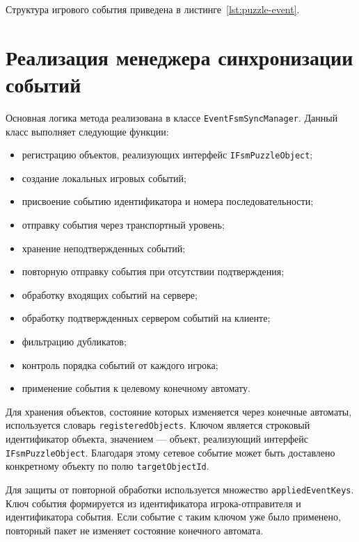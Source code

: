 
Структура игрового события приведена в листинге~\ref{lst:puzzle-event}.


\section{Реализация менеджера синхронизации событий}

Основная логика метода реализована в классе \texttt{EventFsmSyncManager}. Данный класс выполняет следующие функции:
\begin{itemize}
	\item регистрацию объектов, реализующих интерфейс \texttt{IFsmPuzzleObject};
	\item создание локальных игровых событий;
	\item присвоение событию идентификатора и номера последовательности;
	\item отправку события через транспортный уровень;
	\item хранение неподтвержденных событий;
	\item повторную отправку события при отсутствии подтверждения;
	\item обработку входящих событий на сервере;
	\item обработку подтвержденных сервером событий на клиенте;
	\item фильтрацию дубликатов;
	\item контроль порядка событий от каждого игрока;
	\item применение события к целевому конечному автомату.
\end{itemize}

Для хранения объектов, состояние которых изменяется через конечные автоматы, используется словарь \texttt{registeredObjects}. 
Ключом является строковый идентификатор объекта, значением --- объект, реализующий интерфейс \texttt{IFsmPuzzleObject}. 
Благодаря этому сетевое событие может быть доставлено конкретному объекту по полю \texttt{targetObjectId}.

Для защиты от повторной обработки используется множество \texttt{appliedEventKeys}. Ключ события формируется из идентификатора игрока-отправителя и идентификатора события. 
Если событие с таким ключом уже было применено, повторный пакет не изменяет состояние конечного автомата.

